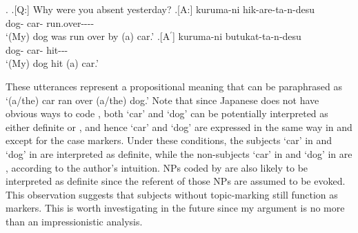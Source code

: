\ex. \a.[Q:] Why were you absent yesterday?
	\bg.[A:]  kuruma-ni hik-are-ta-n-desu \\
		dog- car- run.over---- \\
		`(My) dog was run over by (a) car.'
 \bg.[A$^{\prime}$]  kuruma-ni butukat-ta-n-desu \\
   dog- car- hit--- \\
   `(My) dog hit (a) car.'

These utterances represent a propositional meaning
that can be paraphrased as `(a/the) car ran over (a/the) dog.'
Note that
since Japanese does not have obvious ways to code ,
both `car' and `dog' can be potentially interpreted as either definite or ,
and hence `car' and `dog' are expressed in the same way in \LLast and \Last
except for the case markers.
Under these conditions,
the subjects `car' in \LLast and `dog' in \Last are interpreted as definite, %
while the non-subjects `car' in \Last and `dog' in \LLast are ,
according to the author's intuition.
NPs coded by  are also likely to be interpreted as definite since
the referent of those NPs are assumed to be evoked.
This observation suggests that subjects without topic-marking still function as  markers.
This is worth investigating in the future
since my argument is no more than an impressionistic analysis.


%

